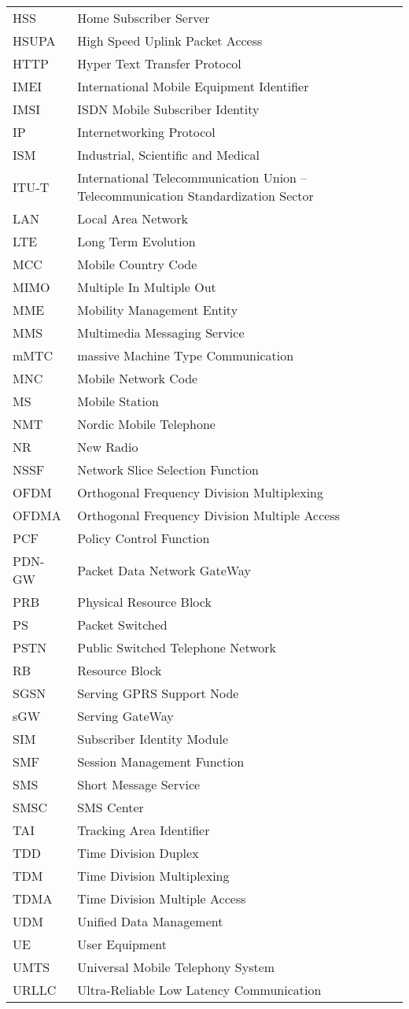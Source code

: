 \begin{supertabular}{ll}
HSS & Home Subscriber Server \\
HSUPA & High Speed Uplink Packet Access \\
HTTP & Hyper Text Transfer Protocol \\
IMEI & International Mobile Equipment Identifier \\
IMSI & ISDN Mobile Subscriber Identity \\
IP & Internetworking Protocol \\
ISM & Industrial, Scientific and Medical \\
ITU-T & International Telecommunication Union -- Telecommunication Standardization Sector \\
LAN & Local Area Network \\
LTE & Long Term Evolution \\
MCC & Mobile Country Code \\
MIMO & Multiple In Multiple Out \\
MME & Mobility Management Entity \\
MMS & Multimedia Messaging Service \\
mMTC & massive Machine Type Communication \\
MNC & Mobile Network Code \\
MS & Mobile Station \\
NMT & Nordic Mobile Telephone \\
NR & New Radio \\
NSSF & Network Slice Selection Function \\
OFDM & Orthogonal Frequency Division Multiplexing \\
OFDMA & Orthogonal Frequency Division Multiple Access \\
PCF & Policy Control Function \\
PDN-GW & Packet Data Network GateWay \\
PRB & Physical Resource Block \\
PS & Packet Switched \\
PSTN & Public Switched Telephone Network \\
RB & Resource Block \\
SGSN & Serving GPRS Support Node \\
sGW & Serving GateWay \\
SIM & Subscriber Identity Module \\
SMF & Session Management Function \\
SMS & Short Message Service \\
SMSC & SMS Center \\
TAI & Tracking Area Identifier \\
TDD & Time Division Duplex \\
TDM & Time Division Multiplexing \\
TDMA & Time Division Multiple Access \\
UDM & Unified Data Management \\
UE & User Equipment \\
UMTS & Universal Mobile Telephony System \\
URLLC & Ultra-Reliable Low Latency Communication \\
\end{supertabular}
